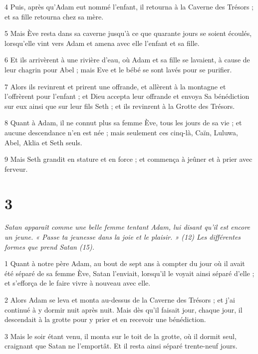 \par 4 Puis, après qu'Adam eut nommé l'enfant, il retourna à la Caverne des Trésors ; et sa fille retourna chez sa mère.

\par 5 Mais Ève resta dans sa caverne jusqu'à ce que quarante jours se soient écoulés, lorsqu'elle vint vers Adam et amena avec elle l'enfant et sa fille.

\par 6 Et ils arrivèrent à une rivière d'eau, où Adam et sa fille se lavaient, à cause de leur chagrin pour Abel ; mais Eve et le bébé se sont lavés pour se purifier.

\par 7 Alors ils revinrent et prirent une offrande, et allèrent à la montagne et l'offrèrent pour l'enfant ; et Dieu accepta leur offrande et envoya Sa bénédiction sur eux ainsi que sur leur fils Seth ; et ils revinrent à la Grotte des Trésors.

\par 8 Quant à Adam, il ne connut plus sa femme Ève, tous les jours de sa vie ; et aucune descendance n'en est née ; mais seulement ces cinq-là, Caïn, Luluwa, Abel, Aklia et Seth seuls.

\par 9 Mais Seth grandit en stature et en force ; et commença à jeûner et à prier avec ferveur.

\chapter{3}

\par \textit{Satan apparaît comme une belle femme tentant Adam, lui disant qu'il est encore un jeune. « Passe ta jeunesse dans la joie et le plaisir. » (12) Les différentes formes que prend Satan (15).}

\par 1 Quant à notre père Adam, au bout de sept ans à compter du jour où il avait été séparé de sa femme Ève, Satan l'enviait, lorsqu'il le voyait ainsi séparé d'elle ; et s'efforça de le faire vivre à nouveau avec elle.

\par 2 Alors Adam se leva et monta au-dessus de la Caverne des Trésors ; et j'ai continué à y dormir nuit après nuit. Mais dès qu'il faisait jour, chaque jour, il descendait à la grotte pour y prier et en recevoir une bénédiction.

\par 3 Mais le soir étant venu, il monta sur le toit de la grotte, où il dormit seul, craignant que Satan ne l'emportât. Et il resta ainsi séparé trente-neuf jours.

